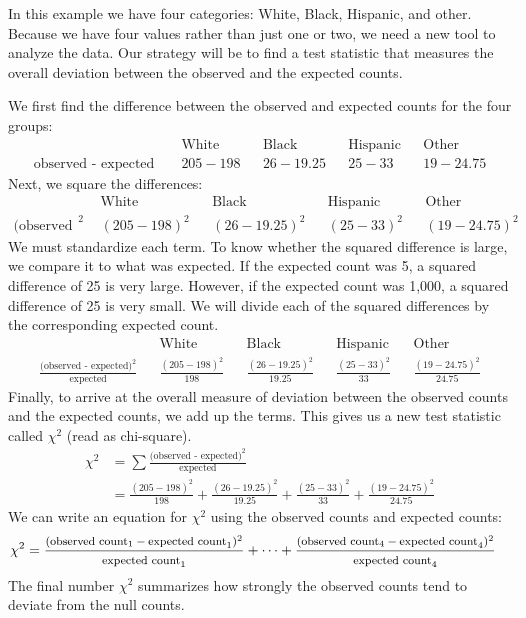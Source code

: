 In this example we have four categories: White, Black, Hispanic, and other. Because we have four values rather than just one or two, we need a new tool to analyze the data. Our strategy will be to find a test statistic that measures the overall deviation between the observed and the expected counts. 

\D{\newpage}

We first find the difference between the observed and expected counts for the four groups:
\begin{align*}
&&\text{White} && \text{Black} && \text{Hispanic} && \text{Other} \\
\text{observed - expected }&& 205-198 && 26-19.25
	&& 25-33
	&& 19-24.75
\end{align*}
Next, we square the differences:
\begin{align*}
&&\text{White} && \text{Black} && \text{Hispanic} && \text{Other} \\
\text{(observed - expected)}^2 && (205-198)^2 && (26-19.25)^2
	&& (25-33)^2
	&& (19-24.75)^2
\end{align*}
We must standardize each term. To know whether the squared difference is large, we compare it to what was expected. If the expected count was 5, a squared difference of 25 is very large. However, if the expected count was 1,000, a squared difference of 25 is very small. We will divide each of the squared differences by the corresponding expected count.
\begin{align*}
&&\text{White} && \text{Black} && \text{Hispanic} && \text{Other} \\
\frac{\text{(observed - expected)}^2}{\text{expected}} && \frac{(205-198)^2}{198} && \frac{(26-19.25)^2 }{19.25}
	&& \frac{(25-33)^2}{33}
	&& \frac{(19-24.75)^2}{24.75}
\end{align*}
Finally, to arrive at the overall measure of deviation between the observed counts and the expected counts, we add up the terms.  This gives us a new test statistic called $\chi^2$ (read as chi-square).
\begin{align*}
\chi^2 &= \sum{\frac{\text{(observed - expected)}^2}{\text{expected}}} \\
	&= \frac{(205-198)^2}{198}
		+ \frac{(26-19.25)^2 }{19.25}
		+ \frac{(25-33)^2}{33}
		+ \frac{(19-24.75)^2}{24.75}
\end{align*}
We can write an equation for $\chi^2$ using the observed counts and expected counts:
{\begin{align*}
\chi^2 &=
	\frac
	{\text{\footnotesize$(\text{observed count}_1 - \text{expected count}_1)^2$}}
	{\text{\footnotesize$\text{expected count}_1$}}
	+ \dots + \frac
	{\text{\footnotesize$(\text{observed count}_4 - \text{expected count}_4)^2$}}
	{\text{\footnotesize$\text{expected count}_4$}}
\end{align*}
}The final number $\chi^2$ summarizes how strongly the observed counts tend to deviate from the null counts.

